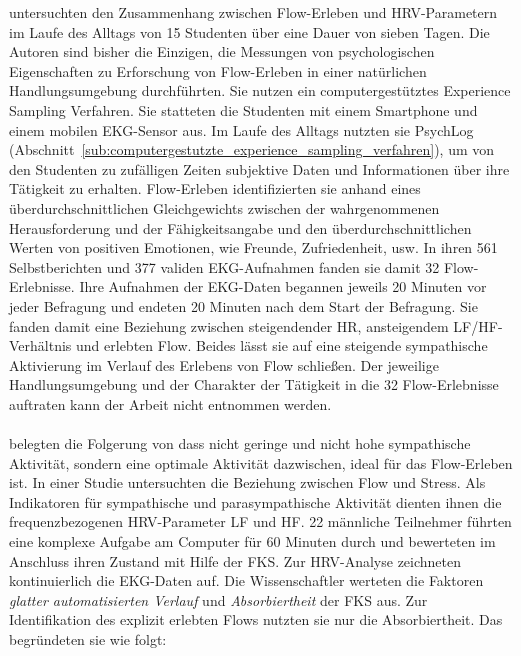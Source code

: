 untersuchten den Zusammenhang zwischen Flow-Erleben und \ac{HRV}-Parametern im Laufe des Alltags von 15 Studenten über eine Dauer von sieben Tagen. Die Autoren sind bisher die Einzigen, die Messungen von psychologischen Eigenschaften zu Erforschung von Flow-Erleben in einer natürlichen Handlungsumgebung durchführten. Sie nutzen ein computergestütztes Experience Sampling Verfahren. Sie statteten die Studenten mit einem Smartphone und einem mobilen \ac{EKG}-Sensor aus. Im Laufe des Alltags nutzten sie PsychLog (Abschnitt~\ref{sub:computergestutzte_experience_sampling_verfahren}), um von den Studenten zu zufälligen Zeiten subjektive Daten und Informationen über ihre Tätigkeit zu erhalten. Flow-Erleben identifizierten sie anhand eines überdurchschnittlichen Gleichgewichts zwischen der wahrgenommenen Herausforderung und der Fähigkeitsangabe und den überdurchschnittlichen Werten von positiven Emotionen, wie Freunde, Zufriedenheit, usw. In ihren 561 Selbstberichten und 377 validen \ac{EKG}-Aufnahmen fanden sie damit 32 Flow-Erlebnisse. Ihre Aufnahmen der \ac{EKG}-Daten begannen jeweils 20 Minuten vor jeder Befragung und endeten 20 Minuten nach dem Start der Befragung. Sie fanden damit eine Beziehung zwischen steigendender HR, ansteigendem \acs{LF}/\acs{HF}-Verhältnis und erlebten Flow. Beides lässt sie auf eine steigende sympathische Aktivierung im Verlauf des Erlebens von Flow schließen. Der jeweilige Handlungsumgebung und der Charakter der Tätigkeit in die 32 Flow-Erlebnisse auftraten kann der Arbeit nicht entnommen werden. 

\paragraph{\citet{Peifer2014}} 

\label{par:peifer2014}

belegten die Folgerung von \citet{deManzano2010, Peifer2012} dass nicht geringe und nicht hohe sympathische Aktivität, sondern eine optimale Aktivität dazwischen, ideal für das Flow-Erleben ist. In einer Studie untersuchten \citet{Peifer2014} die Beziehung zwischen Flow und Stress. Als Indikatoren für sympathische und parasympathische Aktivität dienten ihnen die frequenzbezogenen \ac{HRV}-Parameter \acs{LF} und \acs{HF}. 22 männliche Teilnehmer führten eine komplexe Aufgabe am Computer für 60 Minuten durch und bewerteten im Anschluss ihren Zustand mit Hilfe der \ac{FKS}. Zur \ac{HRV}-Analyse zeichneten \citet{Peifer2014} kontinuierlich die \ac{EKG}-Daten auf. Die Wissenschaftler werteten die Faktoren \emph{glatter automatisierten Verlauf} und \emph{Absorbiertheit} der \ac{FKS} aus. Zur Identifikation des explizit erlebten Flows nutzten sie nur die Absorbiertheit. Das begründeten sie wie folgt:

